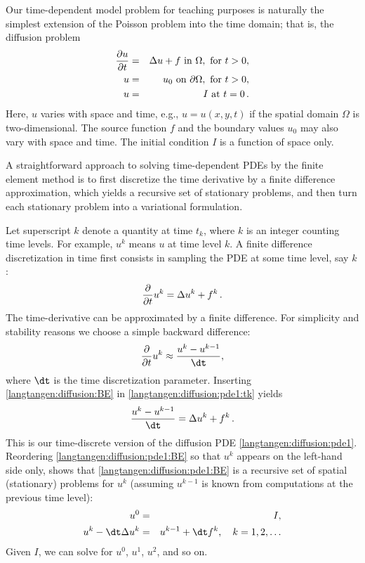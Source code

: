 Our time-dependent
model problem for teaching purposes is naturally the simplest
extension of the Poisson problem into the time domain; that is,
the diffusion problem
\begin{eqnarray}
\frac{\partial u}{\partial t} &=& \Delta u + f \mbox{ in } \Omega, \hbox{ for } t>0,
\label{langtangen:diffusion:pde1}\\
    u &=& u_0 \mbox{ on } \partial \Omega,\hbox{ for } t>0,
\label{langtangen:diffusion:pde1:bc}\\
    u &=& I   \mbox{ at } t=0\thinspace .
\label{langtangen:diffusion:pde1:ic}
\end{eqnarray}
Here, $u$ varies with space and time, e.g., $u=u(x,y,t)$ if the spatial
domain $\Omega$ is two-dimensional. The source function $f$ and the
boundary values $u_0$ may also vary with space and time.
The initial condition $I$ is a function of space only.

A straightforward approach to solving time-dependent
PDEs by the finite element method is to first discretize the
time derivative by a finite difference approximation, which yields
a recursive set of stationary problems, and then turn each stationary
problem into a variational formulation.

Let superscript $k$ denote
a quantity at time $t_k$,
where $k$ is an integer counting time levels. For example, $u^k$ means
$u$ at time level $k$.
A finite difference discretization in time first consists in
sampling the PDE at some time level, say $k$:
\begin{equation}
  \frac{\partial}{\partial t}u^k = \Delta u^k + f^k\thinspace .
\label{langtangen:diffusion:pde1:tk}
\end{equation}
The time-derivative can be approximated by a finite difference.
For simplicity and stability reasons we choose a
simple backward difference:
\begin{equation}
  \frac{\partial}{\partial t} u^k\approx \frac{u^k - u^{k-1}}{\dt},
\label{langtangen:diffusion:BE}
\end{equation}
where ${\dt}$ is the time discretization parameter.
Inserting \eqref{langtangen:diffusion:BE} in \eqref{langtangen:diffusion:pde1:tk}
yields
\begin{equation}
  \frac{u^k - u^{k-1}}{\dt} = \Delta u^k + f^k\langtangenep
\label{langtangen:diffusion:pde1:BE}
\end{equation}
This is our time-discrete version of the diffusion PDE \eqref{langtangen:diffusion:pde1}.
Reordering \eqref{langtangen:diffusion:pde1:BE} so that $u^k$ appears
on the left-hand side only, shows that \eqref{langtangen:diffusion:pde1:BE}
is a recursive set of
spatial (stationary) problems for $u^k$ (assuming $u^{k-1}$ is known from
computations at the previous time level):
\begin{eqnarray}
u^0 &=& I,\label{langtangen:diffusion:pde1:u0}\\
u^k - {\dt}\Delta u^k &=&  u^{k-1} + {\dt} f^k,\quad k=1,2,\ldots
\label{langtangen:diffusion:pde1:uk}
\end{eqnarray}
Given $I$, we can solve for $u^0$, $u^1$, $u^2$, and so on.

